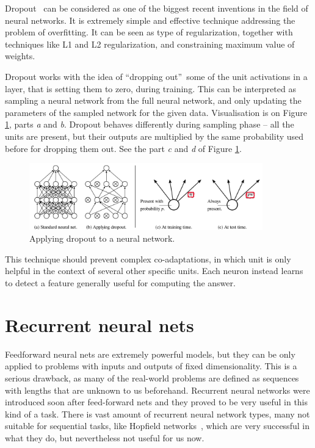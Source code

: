 Dropout~\cite{DBLP:journals/corr/abs-1207-0580, JMLR:v15:srivastava14a} can be considered as one of the biggest recent inventions in the field of neural networks. It is extremely simple and effective technique addressing the problem of overfitting. It can be seen as type of regularization, together with techniques like L1 and L2 regularization, and constraining maximum value of weights.

Dropout works with the idea of \textquotedblleft dropping out\textquotedblright\ some of the unit activations in a layer, that is setting them to zero, during training. This can be interpreted as sampling a neural network from the full neural network, and only updating the parameters of the sampled network for the given data. Visualisation is on Figure \ref{fig:dropout}, parts \emph{a} and \emph{b}. Dropout behaves differently during sampling phase -- all the units are present, but their outputs are multiplied by the same probability used before for dropping them out. See the part \emph{c} and \emph{d} of Figure \ref{fig:dropout}.

\begin{figure}[!t]
	\centering
	\includegraphics[width=0.9\textwidth]{fig/dropout.pdf}
	\caption{Applying dropout to a neural network.
		\label{fig:dropout}}
\end{figure}

This technique should prevent complex co-adaptations, in which unit is only helpful in the context of several other specific units. Each neuron instead learns to detect a feature generally useful for computing the answer.

\section{Recurrent neural nets}

Feedforward neural nets are extremely powerful models, but they can be only applied to problems with inputs and outputs of fixed dimensionality. This is a serious drawback, as many of the real-world problems are defined as sequences with lengths that are unknown to us beforehand. Recurrent neural networks were introduced soon after feed-forward nets and they proved to be very useful in this kind of a task. There is vast amount of recurrent neural network types, many not suitable for sequential tasks, like Hopfield networks~\cite{hopfield1982neural}, which are very successful in what they do, but nevertheless not useful for us now.

